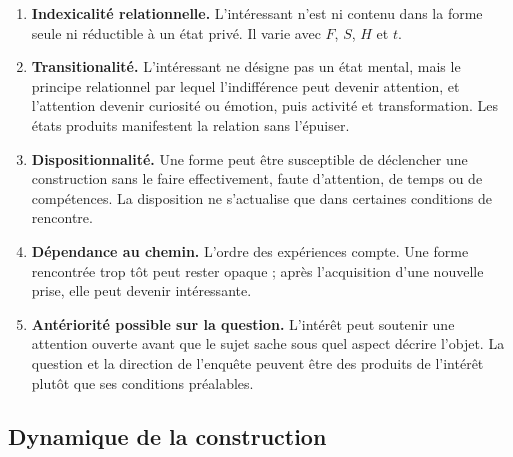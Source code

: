 \documentclass[11pt,a4paper]{article}
\begin{document}
\begin{enumerate}
  \item \textbf{Indexicalité relationnelle.} L'intéressant n'est ni contenu
        dans la forme seule ni réductible à un état privé. Il varie avec
        \(F\), \(S\), \(H\) et \(t\).
  \item \textbf{Transitionalité.} L'intéressant ne désigne pas un état mental,
        mais le principe relationnel par lequel l'indifférence peut devenir
        attention, et l'attention devenir curiosité ou émotion, puis activité et
        transformation. Les états produits manifestent la relation sans
        l'épuiser.
  \item \textbf{Dispositionnalité.} Une forme peut être susceptible de
        déclencher une construction sans le faire effectivement, faute
        d'attention, de temps ou de compétences. La disposition ne s'actualise
        que dans certaines conditions de rencontre.
  \item \textbf{Dépendance au chemin.} L'ordre des expériences compte. Une
        forme rencontrée trop tôt peut rester opaque ; après l'acquisition
        d'une nouvelle prise, elle peut devenir intéressante.
  \item \textbf{Antériorité possible sur la question.} L'intérêt peut soutenir
        une attention ouverte avant que le sujet sache sous quel aspect décrire
        l'objet. La question et la direction de l'enquête peuvent être des
        produits de l'intérêt plutôt que ses conditions préalables.
\end{enumerate}

\subsection{Dynamique de la construction}
\end{document}
